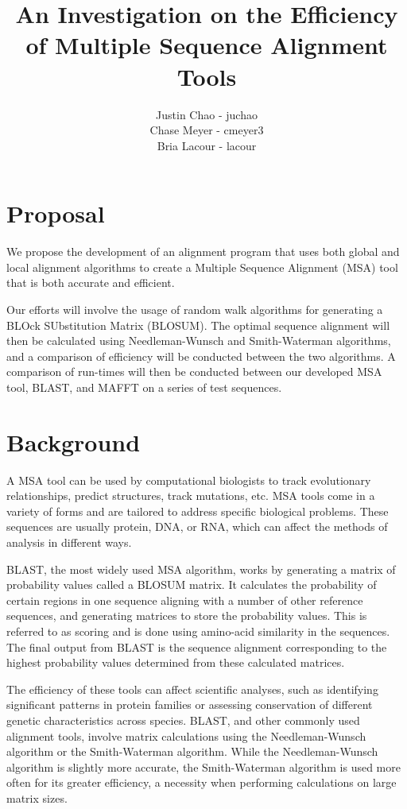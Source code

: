 \documentclass{article}
\begin{document}
\title{An Investigation on the Efficiency of Multiple Sequence Alignment Tools}
\author {Justin Chao - juchao \\
		Chase Meyer - cmeyer3 \\
		Bria Lacour - lacour}

\maketitle

\section*{Proposal}
We propose the development of an alignment program that uses both
global and local alignment algorithms to create a Multiple Sequence Alignment
(MSA) tool that is both accurate and efficient. 

Our efforts will involve the usage of random walk algorithms for generating a
BLOck SUbstitution Matrix (BLOSUM). The optimal sequence alignment will then be
calculated using Needleman-Wunsch and Smith-Waterman algorithms, and a
comparison of efficiency will be conducted between the two algorithms. A
comparison of run-times will then be conducted between our developed MSA tool,
BLAST, and MAFFT on a series of test sequences. 

\section*{Background}
A MSA tool can be used by computational biologists to track evolutionary
relationships, predict structures, track mutations, etc. MSA tools come in a
variety of forms and are tailored to address specific biological problems.
These sequences are usually protein, DNA, or RNA, which can affect the methods
of analysis in different ways.  

BLAST, the most widely used MSA algorithm, works by generating a matrix of
probability values called a BLOSUM matrix. It calculates the probability of
certain regions in one sequence aligning with a number of other reference
sequences, and generating matrices to store the probability values. This is
referred to as scoring and is done using amino-acid similarity in the
sequences. The final output from BLAST is the sequence alignment corresponding
to the highest probability values determined from these calculated matrices. 

The efficiency of these tools can affect scientific analyses, such as
identifying significant patterns in protein families or assessing conservation
of different genetic characteristics across species.  BLAST, and other commonly
used alignment tools, involve matrix calculations using the Needleman-Wunsch
algorithm or the Smith-Waterman algorithm. While the Needleman-Wunsch algorithm
is slightly more accurate, the Smith-Waterman algorithm is used more often for
its greater efficiency, a necessity when performing calculations on large
matrix sizes. 
\end{document}
